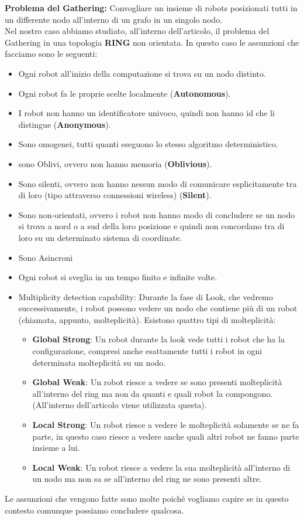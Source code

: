 \textbf{Problema del Gathering:} Convogliare un insieme di robots posizionati tutti in un differente nodo all'interno di un grafo in un singolo nodo.\\
Nel nostro caso abbiamo studiato, all'interno dell'articolo, il problema del Gathering in una topologia \textbf{RING} non orientata. In questo caso le assunzioni che facciamo sono le seguenti:
\begin{itemize}
    \item Ogni robot all'inizio della computazione si trova su un nodo distinto.
    \item Ogni robot fa le proprie scelte localmente (\textbf{Autonomous}).
    \item I robot non hanno un identificatore univoco, quindi non hanno id che li distingue (\textbf{Anonymous}).
    \item Sono omogenei, tutti quanti eseguono lo stesso algoritmo deterministico.
    \item sono Oblivi, ovvero non hanno memoria (\textbf{Oblivious}).
    \item Sono silenti, ovvero non hanno nessun modo di comunicare esplicitamente tra di loro (tipo attraverso connessioni wireless) (\textbf{Silent}).
    \item Sono non-orientati, ovvero i robot non hanno modo di concludere se un nodo si trova a nord o a sud della loro posizione e quindi non concordano tra di loro su un determinato sistema di coordinate.
    \item Sono Asincroni
    \item Ogni robot si sveglia in un tempo finito e infinite volte.
    \item Multiplicity detection capability: Durante la fase di Look, che vedremo successivamente, i robot possono vedere un nodo che contiene più di un robot (chiamata, appunto, molteplicità). Esistono quattro tipi di molteplicità:
    \begin{itemize}
    \item \textbf{Global Strong}: Un robot durante la look vede tutti i robot che ha la configurazione, compresi anche esattamente tutti i robot in ogni determinata molteplicità su un nodo. 
    \item \textbf{Global Weak}: Un robot riesce a vedere se sono presenti molteplicità all'interno del ring ma non da quanti e quali robot la compongono. (All'interno dell'articolo viene utilizzata questa).
    \item \textbf{Local Strong}: Un robot riesce a vedere le molteplicità solamente se ne fa parte, in questo caso riesce a vedere anche quali altri robot ne fanno parte insieme a lui.
    \item \textbf{Local Weak}: Un robot riesce a vedere la sua molteplicità all'interno di un nodo ma non sa se all'interno del ring ne sono presenti altre.
    \end{itemize}
\end{itemize}
Le assunzioni che vengono fatte sono molte poiché vogliamo capire se in questo contesto comunque possiamo concludere qualcosa.\\
